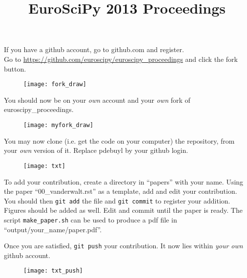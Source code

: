 \documentclass[portrait]{sciposter}
\title{EuroSciPy 2013 Proceedings}
\author{}
\institute{}
\begin{document}

\maketitle

\begin{multicols}{2}

If you have a github account, go to github.com and register.\\

Go to \url{https://github.com/euroscipy/euroscipy_proceedings} and click the
fork button.

  \begin{figure}[h]
    \centering
    \texttt{[image: fork\_draw]}
  \end{figure}

  You should now be on your {\em own} account and your {\em own} fork of
  euroscipy\_proceedings.

  \begin{figure}[h]
    \centering
    \texttt{[image: myfork\_draw]}
  \end{figure}

  You may now clone (i.e. get the code on your computer) the repository, from
  your {\em own} version of it. Replace pdebuyl by your github login.

  \begin{figure}[h]
    \centering
    \texttt{[image: txt]}
  \end{figure}

  To add your contribution, create a directory in ``papers'' with your
  name. Using the paper ``00\_vanderwalt.rst'' as a template, add and edit your
  contribution.\\

  You should then {\tt git add} the file and {\tt git commit} to register your
  addition. Figures should be added as well. Edit and commit until the paper is
  ready. The script {\tt make\_paper.sh} can be used to produce a pdf file in
  ``output/your\_name/paper.pdf''.

  Once you are satisfied, {\tt git push} your contribution. It now lies within
  {\em your own} github account.

  \begin{figure}[h]
    \centering
    \texttt{[image: txt\_push]}
  \end{figure}


\end{multicols}
\end{document}
